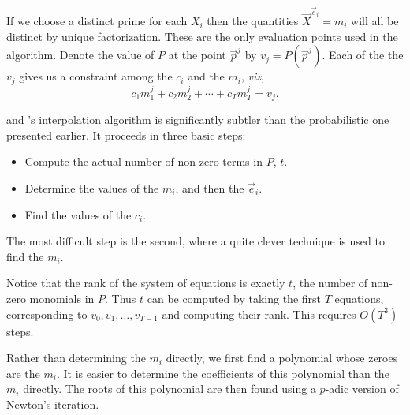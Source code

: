 If we choose a distinct prime for each $X_i$ then the quantities
${\vec X}^{\vec e_i} = m_i$ will all be distinct by unique
factorization.  These are the only evaluation points used in the
algorithm.  Denote the value of $P$ at the point ${\vec p}^j$ by $v_j
= P({\vec p}^j)$.  Each of the the $v_j$ gives us a constraint among
the $c_i$ and the $m_i$, {\em viz\/},
\begin{equation}
c_1 m_1^j + c_2 m_2^j + \cdots + c_T m_T^j = v_j.
\label{Eq:d}
\end{equation}

{\BenOr} and {\Tiwari}'s interpolation algorithm is significantly
subtler than the probabilistic one presented earlier.  It proceeds in
three basic steps:

\begin{itemize}

\item Compute the actual number of non-zero terms in $P$, $t$.

\item Determine the values of the $m_i$, and then the $\vec e_i$.

\item Find the values of the $c_i$.

\end{itemize}

The most difficult step is the second, where a quite clever technique
is used to find the $m_i$.

\def\Step#1{\smallskip\noindent{\bf Step #1:}}

\Step{1}
Notice that the rank of the system of equations  is
exactly $t$, the number of non-zero monomials in $P$.  Thus $t$ can be
computed by taking the first $T$ equations, corresponding to $v_0,
v_1, \ldots, v_{T-1}$ and computing their rank.  This requires
$O(T^3)$ steps.

\Step{2}
Rather than determining the $m_i$ directly, we first find a polynomial
whose zeroes are the $m_i$.  It is easier to determine the
coefficients of this polynomial than the $m_i$ directly.  The roots of
this polynomial are then found using a $p$-adic version of Newton's
iteration.

